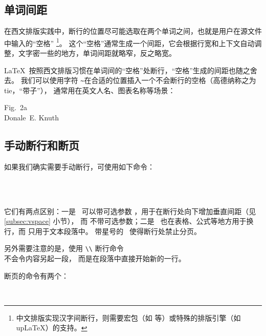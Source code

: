 \subsection{单词间距}\label{subsec:interword}

在西文排版实践中，断行的位置尽可能选取在两个单词之间，也就是用户在源文件中输入的“空格”%
\footnote{中文排版实现汉字间断行，则需要宏包（如  等）或特殊的排版引擎（如 up\LaTeX{}）的支持。}。
这个“空格”通常生成一个间距，它会根据行宽和上下文自动调整，文字密一些的地方，单词间距就略窄，反之略宽。

\LaTeX\ 按照西文排版习惯在单词间的“空格”处断行，“空格”生成的间距也随之舍去。
我们可以使用字符 \texttt\textasciitilde 在合适的位置插入一个不会断行的空格（高德纳称之为 tie，“带子”），
通常用在英文人名、图表名称等场景：
\begin{example}
Fig.~2a \\
Donale~E. Knuth
\end{example}

\subsection{手动断行和断页}\label{subsec:manual-break}

 
如果我们确实需要手动断行，可使用如下命令：
\begin{command}
\crcmd {} \\
\crcmd*{} \\
\end{command}

它们有两点区别：一是 \crcmd\ 可以带可选参数 ，用于在断行处向下增加垂直间距（见 \ref{subsec:vspace} 小节），
而  不带可选参数；二是 \crcmd\ 也在表格、公式等地方用于换行，而  只用于文本段落中。
带星号的 \crcmd\ 使得断行处禁止分页。

\begin{example}
另外需要注意的是，使用 \verb|\\|
断行命令 \\ 不会令内容另起一段，
而是在段落中直接开始新的一行。
\end{example}

断页的命令有两个：
\begin{command}
 \\
\end{command}

